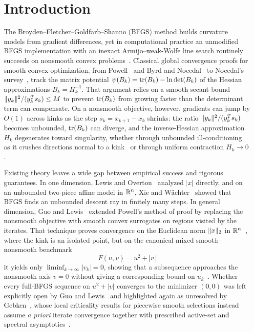 \section{Introduction}\label{art:introduction}

The Broyden--Fletcher--Goldfarb--Shanno (BFGS) method builds curvature models
from gradient differences, yet in computational practice an unmodified BFGS
implementation with an inexact Armijo--weak-Wolfe line search routinely succeeds
on nonsmooth convex problems~\cite{LO}. Classical global convergence proofs for
smooth convex optimization, from Powell~\cite{FND_P76} and Byrd and
Nocedal~\cite{FND_BN89} to Nocedal's survey~\cite{FND_N92}, track the matrix
potential $\psi(B_k)=\operatorname{tr}(B_k)-\ln\det(B_k)$ of the Hessian approximations
$B_k=H_k^{-1}$. That argument relies on a smooth secant bound
$\lVert y_k\rVert^2/(y_k^Ts_k)\le M$ to prevent $\operatorname{tr}(B_k)$ from growing faster than
the determinant term can compensate. On a nonsmooth objective, however, gradients can jump by $O(1)$ across kinks as
the step $s_k=x_{k+1}-x_k$ shrinks: the ratio $\lVert y_k\rVert^2/(y_k^Ts_k)$ becomes
unbounded, $\operatorname{tr}(B_k)$ can diverge, and the inverse-Hessian approximation $H_k$
degenerates toward singularity, whether through unbounded ill-conditioning as
it crushes directions normal to a kink~\cite{LO} or through uniform contraction
$H_k\to0$.

Existing theory leaves a wide gap between empirical success and rigorous
guarantees. In one dimension, Lewis and Overton~\cite[Section~5.1]{LO} analyzed
$|x|$ directly, and on an unbounded two-piece affine model in $\mathbb R^n$, Xie and
W\"achter~ showed that BFGS finds an unbounded
descent ray in finitely many steps. In general dimension, Guo and
Lewis~\cite[Theorems~3.2, 4.1, and~4.3]{GL18} extended Powell's method of proof
by replacing the nonsmooth objective with smooth convex surrogates on regions
visited by the iterates. That technique proves convergence on the Euclidean
norm $\lVert x\rVert_2$ in $\mathbb R^n$~\cite[Corollary~4.2]{GL18}, where the kink is an
isolated point, but on the canonical mixed smooth--nonsmooth benchmark
\[
 F(u,v)=u^2+|v|
\]
it yields only $\liminf_{k\to\infty}|v_k|=0$, showing that a subsequence
approaches the nonsmooth axis $v=0$ without giving a corresponding bound on
$u_k$~\cite[Corollary~4.4]{GL18}.
Whether every full-BFGS sequence on $u^2+|v|$ converges to the minimizer
$(0,0)$ was left explicitly open by Guo and Lewis~\cite[p.~1309]{GL18} and
highlighted again as unresolved by Gebken~\cite{BG}, whose local criticality
results for piecewise smooth selections instead assume \emph{a priori} iterate
convergence together with prescribed active-set and spectral
asymptotics~\cite[Theorem~3.1 and~(B1)]{BG}.

